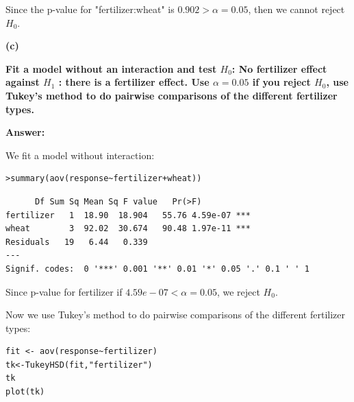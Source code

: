 \documentclass[letterpaper,11pt]{article}
\begin{document}
Since the p-value for "fertilizer:wheat" is $0.902>\alpha = 0.05$, then we cannot reject $H_0$.

\bigbreak
\begin{addmargin}[-1.1em]{0em}
\textbf{(c)}\par\end{addmargin}
\textbf{Fit a model without an interaction and test $H_0$: No fertilizer effect against $H_1$ : there is a fertilizer effect. Use $\alpha = 0.05$ if you reject $H_0$, use Tukey’s method to do pairwise comparisons of the different fertilizer types.}\par
    \bigbreak
    \begin{addmargin}[-0.5em]{0em}    \textbf{Answer: }\end{addmargin}
We fit a model without interaction:
\begin{lstlisting}
>summary(aov(response~fertilizer+wheat))
\end{lstlisting}

\begin{lstlisting}
      Df Sum Sq Mean Sq F value   Pr(>F)
fertilizer   1  18.90  18.904   55.76 4.59e-07 ***
wheat        3  92.02  30.674   90.48 1.97e-11 ***
Residuals   19   6.44   0.339
---
Signif. codes:  0 '***' 0.001 '**' 0.01 '*' 0.05 '.' 0.1 ' ' 1
\end{lstlisting}

Since p-value for fertilizer if $4.59e-07<\alpha = 0.05$, we reject $H_0$.\par
Now we use Tukey's method to do pairwise comparisons of the different fertilizer types:

\begin{lstlisting}
fit <- aov(response~fertilizer)
tk<-TukeyHSD(fit,"fertilizer")
tk
plot(tk)
\end{lstlisting}

\begin{center}
\end{center}
\end{document}
